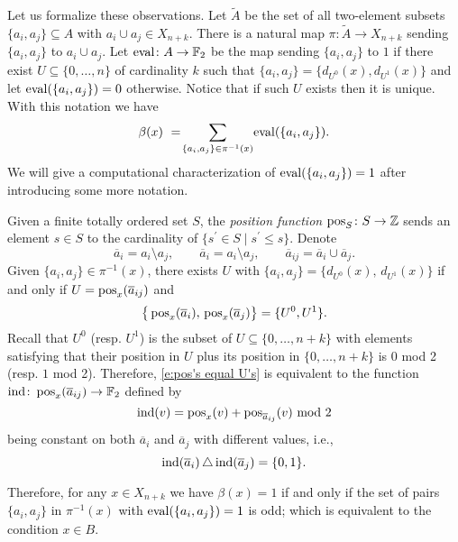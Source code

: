Let us formalize these observations.
Let $\widetilde{A}$ be the set of all two-element subsets $\{a_i, a_j\} \subseteq A$ with $a_i \cup a_j \in X_{n+k}$.
There is a natural map $\pi \colon \widetilde{A} \to X_{n+k}$ sending $\{a_i, a_j\}$ to $a_i \cup a_j$.
Let $\operatorname{eval} \colon A \to {\mathbb{F}_2}$ be the map sending $\{a_i, a_j\}$ to $1$ if there exist $U \subseteq \{0,\dots,n\}$ of cardinality $k$ such that $\{a_i, a_j\} = \{d_{U^0}(x), d_{U^1}(x)\}$ and let $\operatorname{eval}(\{a_i, a_j\}) = 0$ otherwise.
Notice that if such $U$ exists then it is unique.
With this notation we have
\begin{equation*}
\beta(x) \ = \! \sum_{\{a_i, a_j\} \in \pi^{-1}(x)} \! \operatorname{eval}(\{a_i, a_j\}).
\end{equation*}
We will give a computational characterization of $\operatorname{eval}(\{a_i, a_j\}) = 1$ after introducing some more notation.

Given a finite totally ordered set $S$, the \textit{position function} $\operatorname{pos}_S \colon S \to \mathbb{Z}$ sends an element $s \in S$ to the cardinality of $\{s^\prime \in S \mid s^\prime \leq s\}$.
Denote
\begin{equation*}
\overline{a}_{i} = a_i \setminus a_j, \qquad
\overline{a}_{i} = a_i \setminus a_j, \qquad
\overline{a}_{ij} = \overline{a}_i \cup \overline{a}_j.
\end{equation*}
Given $\{a_i, a_j\} \in \pi^{-1}(x)$, there exists $U$ with $\{a_i, a_j\} = \{d_{U^0}(x),\, d_{U^1}(x)\}$
if and only if $U = \operatorname{pos}_{x}(\overline{a}_{ij})$ and
\begin{equation} \label{e:pos's equal U's}
\big\{\operatorname{pos}_{x}(\overline{a}_i),\, \operatorname{pos}_{x}(\overline{a}_j)\big\} = \{U^0, U^1\}.
\end{equation}
Recall that $U^0$ (resp. $U^1$) is the subset of $U \subseteq \{0, \dots, n+k\}$ with elements satisfying that their position in $U$ plus its position in $\{0, \dots, n+k\}$ is $0$ mod 2 (resp. $1$ mod 2).
Therefore, \eqref{e:pos's equal U's} is equivalent to the function $\mathrm{ind} \colon \operatorname{pos}_x(\overline{a}_{ij}) \to {\mathbb{F}_2}$ defined by
\begin{equation*}
\mathrm{ind}(v) = \operatorname{pos}_{x}(v) + \operatorname{pos}_{\overline{a}_{ij}}(v) \text{ mod }2
\end{equation*}
being constant on both $\overline{a}_i$ and $\overline{a}_j$ with different values, i.e.,
\begin{equation*}
\mathrm{ind}(\overline{a}_i) \operatorname{\triangle} \mathrm{ind}(\overline{a}_j) = \{0,1\}.
\end{equation*}

Therefore, for any $x \in X_{n+k}$ we have $\beta(x) = 1$ if and only if the set of pairs $\{a_i, a_j\}$ in $\pi^{-1}(x)$ with $\operatorname{eval}(\{a_i, a_j\}) = 1$ is odd; which is equivalent to the condition $x \in B$.